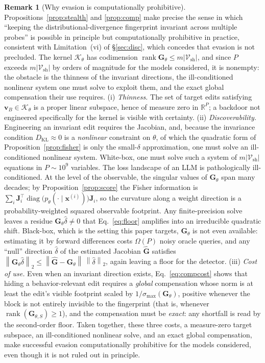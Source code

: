 \documentclass[11pt]{article}
\newcommand{\R}{\mathbb{R}}
\newcommand{\Vsh}{\mathcal{V}_{\mathrm{sh}}}
\newcommand{\norm}[1]{\left\lVert #1 \right\rVert}
\theoremstyle{definition}
\newtheorem{remark}{Remark}
\begin{document}
\begin{remark}[Why evasion is computationally prohibitive]
\label{rem:adv}
Propositions~\ref{prop:stealth} and \ref{prop:comp} make precise the sense in
which ``keeping the distributional-divergence fingerprint invariant across
multiple probes'' is possible in principle but computationally prohibitive in
practice, consistent with Limitation~(vi) of \S\ref{sec:disc}, which concedes
that evasion is not precluded. The kernel $\mathcal{K}_\theta$ has codimension
$\operatorname{rank}\bm{G}_\theta \le m|\Vsh|$, and since $P$ exceeds
$m|\Vsh|$ by orders of magnitude for the models considered, it is nonempty: the
obstacle is the thinness of the invariant directions, the
ill-conditioned nonlinear system one must solve to exploit them, and the exact
global compensation their use requires. (i) \emph{Thinness.} The set of
target edits satisfying $\bm{v}_B \in \mathcal{K}_\theta$ is a proper linear
subspace, hence of measure zero in $\R^P$; a backdoor not engineered
specifically for the kernel is visible with certainty. (ii)
\emph{Discoverability.} Engineering an invariant edit requires the Jacobian,
and, because the invariance condition $D_{\mathrm{KL}} \approx 0$ is a
\emph{nonlinear} constraint on $\theta$, of which the quadratic form of
Proposition~\ref{prop:fisher} is only the small-$\delta$ approximation, one
must solve an ill-conditioned nonlinear system. White-box, one must solve such
a system of $m|\Vsh|$ equations in $P \sim 10^9$ variables. The
loss landscape of an LLM is pathologically ill-conditioned. At the level
of the observable, the singular values of $\bm{G}_\theta$ span many decades; by
Proposition~\ref{prop:score} the Fisher information is $\sum_i \bm{J}_i^\top
\operatorname{diag}\!\big(p_\theta(\cdot\mid \bm{x}^{(i)})\big)\bm{J}_i$, so
the curvature along a weight direction is a probability-weighted squared
observable footprint. Any finite-precision solve leaves a residue
$\bm{G}_\theta\hat\delta \ne 0$ that Eq.~\eqref{eq:floor} amplifies into an
irreducible quadratic shift. Black-box, which is the setting this paper
targets, $\bm{G}_\theta$ is not even available: estimating it by forward
differences costs $\Omega(P)$ noisy oracle queries, and any ``null'' direction
$\hat\delta$ of the estimated Jacobian $\hat{\bm{G}}$ satisfies
$\norm{\bm{G}_\theta\hat\delta}_2 \le \norm{\hat{\bm{G}} - \bm{G}_\theta}
\,\norm{\hat\delta}_2$, again leaving a floor for the detector. (iii)
\emph{Cost of use.} Even when an invariant direction exists,
Eq.~\eqref{eq:compcost} shows that hiding a behavior-relevant edit requires a
\emph{global} compensation whose norm is at least the edit's visible footprint
scaled by $1/\sigma_{\max}(\bm{G}_\theta)$, positive whenever the block is not
entirely invisible to the fingerprint (that is, whenever
$\operatorname{rank}(\bm{G}_{\theta,S}) \ge 1$), and the compensation must be
\emph{exact}: any shortfall is read by the second-order floor. Taken together,
these three costs, a measure-zero target subspace, an ill-conditioned
nonlinear solve, and an exact global compensation, make successful evasion
computationally prohibitive for the models considered, even though it is not
ruled out in principle.
\end{remark}
\end{document}
